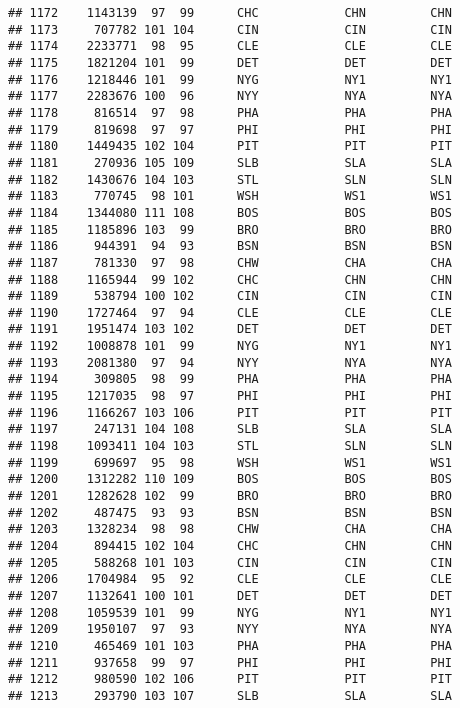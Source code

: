 \documentclass[]{article}
\begin{document}
\begin{verbatim}
## 1172    1143139  97  99      CHC            CHN         CHN
## 1173     707782 101 104      CIN            CIN         CIN
## 1174    2233771  98  95      CLE            CLE         CLE
## 1175    1821204 101  99      DET            DET         DET
## 1176    1218446 101  99      NYG            NY1         NY1
## 1177    2283676 100  96      NYY            NYA         NYA
## 1178     816514  97  98      PHA            PHA         PHA
## 1179     819698  97  97      PHI            PHI         PHI
## 1180    1449435 102 104      PIT            PIT         PIT
## 1181     270936 105 109      SLB            SLA         SLA
## 1182    1430676 104 103      STL            SLN         SLN
## 1183     770745  98 101      WSH            WS1         WS1
## 1184    1344080 111 108      BOS            BOS         BOS
## 1185    1185896 103  99      BRO            BRO         BRO
## 1186     944391  94  93      BSN            BSN         BSN
## 1187     781330  97  98      CHW            CHA         CHA
## 1188    1165944  99 102      CHC            CHN         CHN
## 1189     538794 100 102      CIN            CIN         CIN
## 1190    1727464  97  94      CLE            CLE         CLE
## 1191    1951474 103 102      DET            DET         DET
## 1192    1008878 101  99      NYG            NY1         NY1
## 1193    2081380  97  94      NYY            NYA         NYA
## 1194     309805  98  99      PHA            PHA         PHA
## 1195    1217035  98  97      PHI            PHI         PHI
## 1196    1166267 103 106      PIT            PIT         PIT
## 1197     247131 104 108      SLB            SLA         SLA
## 1198    1093411 104 103      STL            SLN         SLN
## 1199     699697  95  98      WSH            WS1         WS1
## 1200    1312282 110 109      BOS            BOS         BOS
## 1201    1282628 102  99      BRO            BRO         BRO
## 1202     487475  93  93      BSN            BSN         BSN
## 1203    1328234  98  98      CHW            CHA         CHA
## 1204     894415 102 104      CHC            CHN         CHN
## 1205     588268 101 103      CIN            CIN         CIN
## 1206    1704984  95  92      CLE            CLE         CLE
## 1207    1132641 100 101      DET            DET         DET
## 1208    1059539 101  99      NYG            NY1         NY1
## 1209    1950107  97  93      NYY            NYA         NYA
## 1210     465469 101 103      PHA            PHA         PHA
## 1211     937658  99  97      PHI            PHI         PHI
## 1212     980590 102 106      PIT            PIT         PIT
## 1213     293790 103 107      SLB            SLA         SLA

\end{verbatim}
\end{document}
